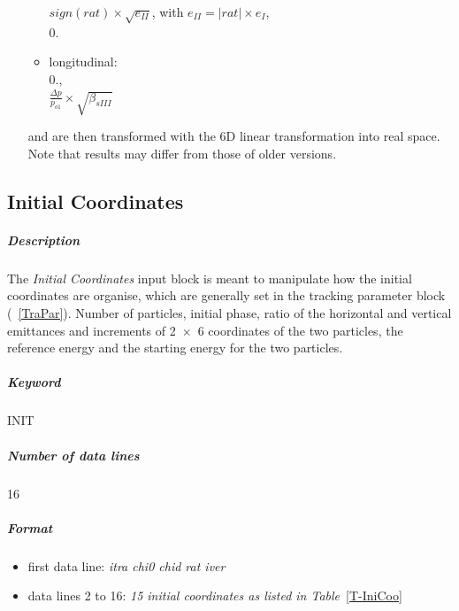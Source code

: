 \documentclass[a4paper,11pt]{report}
\begin{document}
\begin{enumerate}
\begin{itemize}
 $sign(rat)\times \sqrt{e_{II}}$, with $e_{II} =
 \left|rat\right|\times e_{I}$,\\

 $0.$

\item longitudinal: \\

$0.$,\\ 

$\frac{\Delta p}{p_{o1}} \times \sqrt{\beta_{sIII}}$

\end{itemize}
and are then transformed with the 6D linear transformation into real
space. Note that results may differ from those of older versions.
\end{enumerate}

\subsection{Initial Coordinates} \label{IniCoo}

\subparagraph{Description} The {\em Initial Coordinates} \/input block
is meant to manipulate how the initial coordinates are organise, which
are generally set in the tracking parameter block (~\ref{TraPar}).
Number of particles, initial phase, ratio of the horizontal and
vertical emittances and increments of \mbox{2 $\times$ 6} coordinates
of the two particles, the reference energy and the starting energy for
the two particles.

\subparagraph{Keyword} INIT \subparagraph{Number of data lines} 16

\subparagraph{Format}
\begin{itemize}
\item first data line: {\em itra chi0 chid rat iver}
\item data lines 2 to 16: {\em 15 initial coordinates as listed in Table}~\ref{T-IniCoo}
\end{itemize}
\end{document}
